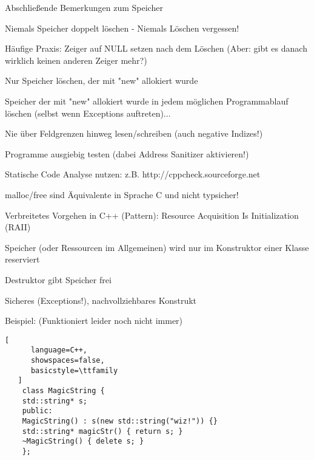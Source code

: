 \documentclass[10pt]{article}
\begin{document}
\begin{itemize*}
  \item Abschließende Bemerkungen zum Speicher
  \begin{itemize*}
    \item Niemals Speicher doppelt löschen - Niemals Löschen vergessen!
    \item Häufige Praxis: Zeiger auf NULL setzen nach dem Löschen (Aber: gibt es danach wirklich keinen anderen Zeiger mehr?)
    \item Nur Speicher löschen, der mit "new" allokiert wurde
    \item Speicher der mit "new" allokiert wurde in jedem möglichen Programmablauf löschen (selbst wenn Exceptions auftreten)...
    \item Nie über Feldgrenzen hinweg lesen/schreiben (auch negative Indizes!)
    \item Programme ausgiebig testen (dabei Address Sanitizer aktivieren!)
    \item Statische Code Analyse nutzen: z.B. http://cppcheck.sourceforge.net
    \item malloc/free sind Äquivalente in Sprache C und nicht typsicher!
  \end{itemize*}
  
  \item Verbreitetes Vorgehen in C++ (Pattern): Resource Acquisition Is Initialization (RAII)
  \begin{itemize*}
    \item Speicher (oder Ressourcen im Allgemeinen) wird nur im Konstruktor einer Klasse reserviert
    \item Destruktor gibt Speicher frei
    \item Sicheres (Exceptions!), nachvollziehbares Konstrukt
    \item Beispiel: (Funktioniert leider noch nicht immer)
    \begin{lstlisting}[
      language=C++,
      showspaces=false,
      basicstyle=\ttfamily
   ]
    class MagicString {
    std::string* s;
    public:
    MagicString() : s(new std::string("wiz!")) {}
    std::string* magicStr() { return s; }
    ~MagicString() { delete s; }
    };
  \end{lstlisting}
  \end{itemize*}
\end{itemize*}
\end{document}
